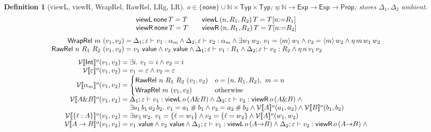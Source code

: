 \documentclass[10pt]{article}
\newtheorem{definition}[theorem]{Definition}
\newcommand{\Int}{\mathsf{Int}}
\newcommand{\tp}{\varepsilon}
\newcommand{\bra}[1]{\alpha_{#1}}
\newcommand{\mrg}{\mathbin{\#}}
\newcommand{\subs}[3]{#1[#2{:=}#3]}
\newcommand{\wrp}[2]{\langle #1\rangle\,#2}
\newcommand{\Val}{\mathsf{value}}
\newcommand{\hast}[4]{#1; #2 \vdash #3 : #4}
\newcommand{\sT}[1]{[\![#1]\!]}
\newcommand{\LRg}[2]{\mathcal{V}\sT{#2}^{#1}}
\begin{document}
\begin{definition}[\textsf{viewL}, \textsf{viewR}, \textsf{WrapRel}, \textsf{RawRel}, \textsf{LRg}, \textsf{LR}]
$o \in \{\mathsf{none}\} \cup \mathbb{N}\times\mathsf{Typ}\times\mathsf{Typ}$; \quad
$\eta : \mathbb{N} \to \mathsf{Exp} \to \mathsf{Exp} \to \mathsf{Prop}$; \quad stores $\Delta_1, \Delta_2$ ambient.
\[
\begin{array}{l@{\qquad}l}
\mathsf{viewL}\,\mathsf{none}\,T = T & \mathsf{viewL}\,(n,R_1,R_2)\,T = \subs{T}{n}{R_1} \\
\mathsf{viewR}\,\mathsf{none}\,T = T & \mathsf{viewR}\,(n,R_1,R_2)\,T = \subs{T}{n}{R_2}
\end{array}
\]
\[
\begin{array}{r@{\;}c@{\;}l}
\mathsf{WrapRel}\ m\ (v_1,v_2) &=& \hast{\Delta_1}{\tp}{v_1}{\bra{m}} \wedge \hast{\Delta_2}{\tp}{v_2}{\bra{m}} \wedge
  \exists w_1\,w_2.\ v_1 = \wrp{m}{w_1} \wedge v_2 = \wrp{m}{w_2} \wedge \eta\,m\,w_1\,w_2 \\
\mathsf{RawRel}\ n\ R_1\ R_2\ (v_1,v_2) &=& v_1\ \Val \wedge v_2\ \Val \wedge
  \hast{\Delta_1}{\tp}{v_1}{R_1} \wedge \hast{\Delta_2}{\tp}{v_2}{R_2} \wedge \eta\,n\,v_1\,v_2
\end{array}
\]
\[
\begin{array}{r@{\;}c@{\;}l}
\LRg{o}{\Int}(v_1,v_2) &=& \exists i.\ v_1 = i \wedge v_2 = i \\
\LRg{o}{\tp}(v_1,v_2) &=& v_1 = \tp \wedge v_2 = \tp \\
\LRg{o}{\bra{m}}(v_1,v_2) &=& \begin{cases}
    \mathsf{RawRel}\ n\ R_1\ R_2\ (v_1,v_2) & o = (n,R_1,R_2),\ m = n \\
    \mathsf{WrapRel}\ m\ (v_1,v_2) & \text{otherwise}
  \end{cases} \\
\LRg{o}{A \& B}(v_1,v_2) &=& \hast{\Delta_1}{\tp}{v_1}{\mathsf{viewL}\,o\,(A\&B)} \wedge \hast{\Delta_2}{\tp}{v_2}{\mathsf{viewR}\,o\,(A\&B)} \;\wedge \\
  && \exists a_1\,b_1\,a_2\,b_2.\ v_1 = a_1 \mrg b_1 \wedge v_2 = a_2 \mrg b_2 \wedge \LRg{o}{A}(a_1,a_2) \wedge \LRg{o}{B}(b_1,b_2) \\
\LRg{o}{\{\ell:A\}}(v_1,v_2) &=& \exists w_1\,w_2.\ v_1 = \{\ell = w_1\} \wedge v_2 = \{\ell = w_2\} \wedge \LRg{o}{A}(w_1,w_2) \\
\LRg{o}{A \to B}(v_1,v_2) &=& v_1\ \Val \wedge v_2\ \Val \wedge
  \hast{\Delta_1}{\tp}{v_1}{\mathsf{viewL}\,o\,(A{\to}B)} \wedge \hast{\Delta_2}{\tp}{v_2}{\mathsf{viewR}\,o\,(A{\to}B)} \;\wedge \\

\end{array}\]
\end{definition}
\end{document}
